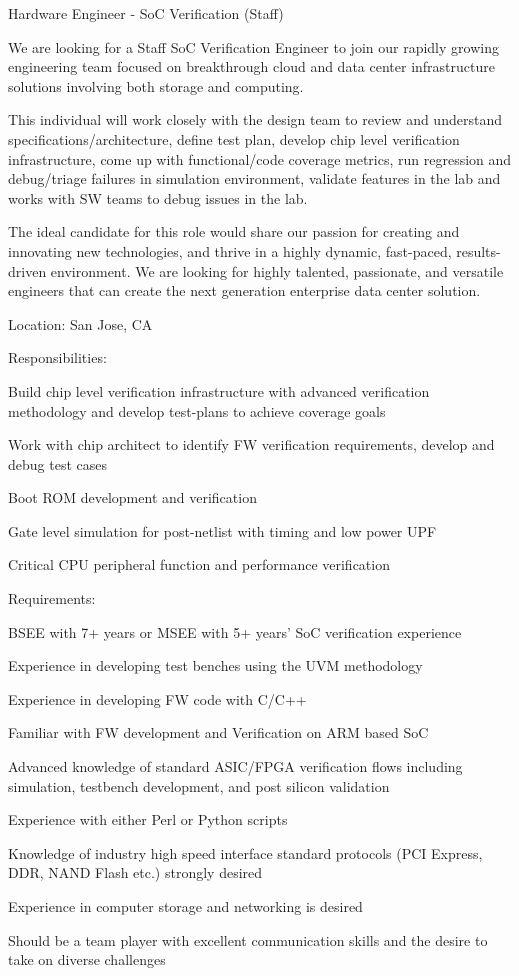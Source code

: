 \break

\par Hardware Engineer - SoC Verification (Staff)
\par We are looking for a Staff SoC Verification Engineer to join our rapidly growing engineering team focused on breakthrough cloud and data center infrastructure solutions involving both storage and computing.
\par This individual will work closely with the design team to review and understand specifications/architecture, define test plan, develop chip level verification infrastructure, come up with functional/code coverage metrics, run regression and debug/triage failures in simulation environment, validate features in the lab and works with SW teams to debug issues in the lab.
\par The ideal candidate for this role would share our passion for creating and innovating new technologies, and thrive in a highly dynamic, fast-paced, results-driven environment. We are looking for highly talented, passionate, and versatile engineers that can create the next generation enterprise data center solution.
\par Location: San Jose, CA
\par Responsibilities:
\par Build chip level verification infrastructure with advanced verification methodology and develop test-plans to achieve coverage goals
\par Work with chip architect to identify FW verification requirements, develop and debug test cases
\par Boot ROM development and verification
\par Gate level simulation for post-netlist with timing and low power UPF
\par Critical CPU peripheral function and performance verification
\par Requirements:
\par BSEE with 7+ years or MSEE with 5+ years’ SoC verification experience
\par Experience in developing test benches using the UVM methodology
\par Experience in developing FW code with C/C++
\par Familiar with FW development and Verification on ARM based SoC
\par Advanced knowledge of standard ASIC/FPGA verification flows including simulation, testbench development, and post silicon validation
\par Experience with either Perl or Python scripts
\par Knowledge of industry high speed interface standard protocols (PCI Express, DDR, NAND Flash etc.) strongly desired
\par Experience in computer storage and networking is desired
\par Should be a team player with excellent communication skills and the desire to take on diverse challenges

